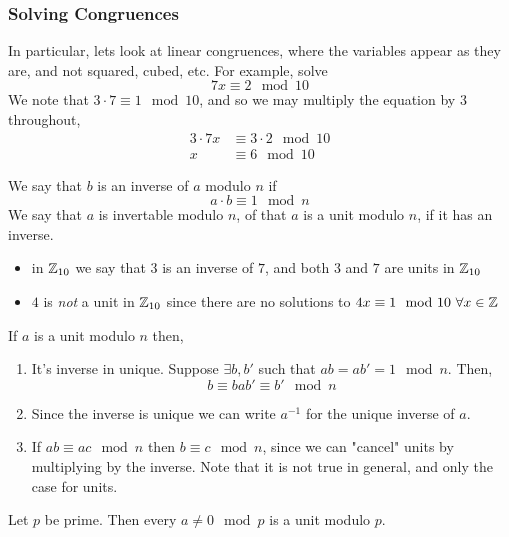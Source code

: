 \documentclass{article}
\begin{document}
\subsubsection*{Solving Congruences}

In particular, lets look at linear congruences, where the variables appear as they are, and not squared, cubed, etc. For example, solve
\[
    7x \equiv 2 \mod 10
\]
We note that $3 \cdot 7 \equiv 1 \mod 10$, and so we may multiply the equation by $3$ throughout,
\begin{align*}
    3 \cdot 7x &\equiv 3 \cdot 2 \mod 10 \\
    x &\equiv 6 \mod 10
\end{align*}

\begin{defi}
    We say that $b$ is an inverse of $a$ modulo $n$ if
    \[
        a \cdot b \equiv 1 \mod n
    \]
    We say that $a$ is invertable modulo $n$, of that $a$ is a unit modulo $n$, if it has an inverse.
\end{defi}

\begin{eg}\leavevmode
    \begin{itemize}
        \item in $\mathbb{Z}_{10}$ we say that $3$ is an inverse of $7$, and both $3$ and $7$ are units in $\mathbb{Z}_{10}$
        \item $4$ is \emph{not} a unit in $\mathbb{Z}_{10}$ since there are no solutions to $4x \equiv 1 \mod 10 \ \forall x \in \mathbb{Z}$
    \end{itemize}
\end{eg}

\begin{remark}
    If $a$ is a unit modulo $n$ then,
    \begin{enumerate}
        \item It's inverse in unique. Suppose $\exists b, b'$ such that $ab = ab' = 1 \mod n$. Then,
        \[
            b \equiv bab' \equiv b' \mod n     
        \]
        \item Since the inverse is unique we can write $a^{-1}$ for the unique inverse of $a$.
        \item If $ab \equiv ac \mod n$ then $b \equiv c \mod n$, since we can "cancel" units by multiplying by the inverse. Note that it is not true in general, and only the case for units. 
    \end{enumerate}
\end{remark}

\begin{nprop}\label{prop:2-10}
    Let $p$ be prime. Then every $a \neq 0 \mod p$ is a unit modulo $p$. 
\end{nprop}
\end{document}
